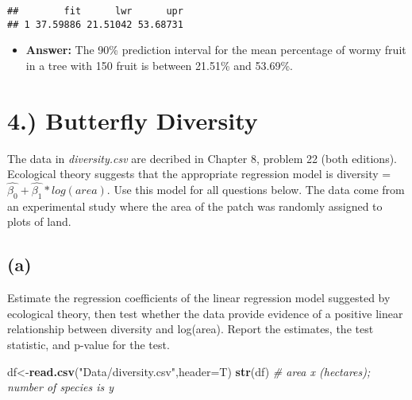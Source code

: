 \documentclass[]{article}
\newenvironment{Shaded}{\begin{snugshade}}{\end{snugshade}}
\newcommand{\KeywordTok}[1]{\textcolor[rgb]{0.13,0.29,0.53}{\textbf{#1}}}
\newcommand{\DataTypeTok}[1]{\textcolor[rgb]{0.13,0.29,0.53}{#1}}
\newcommand{\FloatTok}[1]{\textcolor[rgb]{0.00,0.00,0.81}{#1}}
\newcommand{\StringTok}[1]{\textcolor[rgb]{0.31,0.60,0.02}{#1}}
\newcommand{\CommentTok}[1]{\textcolor[rgb]{0.56,0.35,0.01}{\textit{#1}}}
\newcommand{\OperatorTok}[1]{\textcolor[rgb]{0.81,0.36,0.00}{\textbf{#1}}}
\newcommand{\NormalTok}[1]{#1}
\providecommand{\tightlist}{%
  \setlength{\itemsep}{0pt}\setlength{\parskip}{0pt}}
\begin{document}
\begin{Shaded}
\end{Shaded}

\begin{verbatim}
##        fit      lwr      upr
## 1 37.59886 21.51042 53.68731
\end{verbatim}

\begin{itemize}
\tightlist
\item
  \textbf{Answer:} The 90\% prediction interval for the mean percentage
  of wormy fruit in a tree with 150 fruit is between 21.51\% and
  53.69\%.
\end{itemize}

\section{4.) Butterfly Diversity}\label{butterfly-diversity}

The data in \emph{diversity.csv} are decribed in Chapter 8, problem 22
(both editions). Ecological theory suggests that the appropriate
regression model is diversity =
\(\hat{\beta_0} + \hat{\beta_1} * log(area)\). Use this model for all
questions below. The data come from an experimental study where the area
of the patch was randomly assigned to plots of land.

\subsection{(a)}\label{a-3}

Estimate the regression coefficients of the linear regression model
suggested by ecological theory, then test whether the data provide
evidence of a positive linear relationship between diversity and
log(area). Report the estimates, the test statistic, and p-value for the
test.

\begin{Shaded}
\begin{Highlighting}[]
\NormalTok{df<-}\KeywordTok{read.csv}\NormalTok{(}\StringTok{"Data/diversity.csv"}\NormalTok{,}\DataTypeTok{header=}\NormalTok{T)}
\KeywordTok{str}\NormalTok{(df) }\CommentTok{# area x (hectares); number of species is y}
\end{Highlighting}
\end{Shaded}
\end{document}

